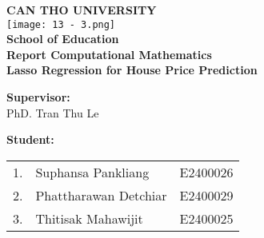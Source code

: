 \documentclass[12pt, a4paper]{report}
\begin{document}
\begin{titlepage}
    \begin{center}
        \textbf{\LARGE CAN THO UNIVERSITY}\\
        \vspace{2cm}
        \texttt{[image: 13 - 3.png]} \\
        \vspace{1cm}
        \textbf{\Large School of Education}\\
        \vspace{0.5cm}
        {\Large \textbf{Report Computational Mathematics}}
        \vspace{2cm}\\
        {\Huge \textbf{Lasso Regression for House Price Prediction}}
    \end{center}
\vspace{1cm}
\noindent
\begin{minipage}[l]{0.45\linewidth}
    \textbf{Supervisor:} \\
     PhD. Tran Thu Le
\end{minipage}
\hfill
\begin{minipage}[l]{0.45\linewidth}
    \textbf{Student:} \\
     \begin{tabular}{lll}
    1. & Suphansa Pankliang\phantom{h} & E2400026 \\
    2. & Phattharawan Detchiar & E2400029 \\
    3. & Thitisak Mahawijit & E2400025 \\
\end{tabular}\\
\end{minipage}\\          
\end{titlepage}
\end{document}
